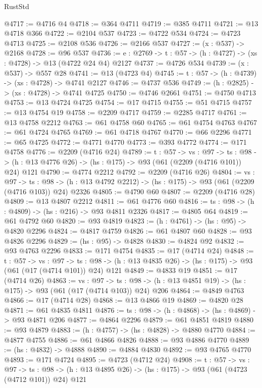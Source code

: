 \begin{lexlean}{RustStd}
\begin{coremodule}
@4717 := @4716 @4
@4718 := @364 @4711
@4719 := @385 @4711
@4721 := @13 @4718 @366
@4722 := @2104 @537
@4723 := @4722 @534
@4724 := @4723 @4713
@4725 := @2108 @536
@4726 := @2166 @537
@4727 := (x : @537) -> @2168
@4728 := @96 @537
@4736 := {e : @2769} -> {t : @57} -> (h : @4727) -> (xs : @4728) -> @13 (@4722 @24 @4) @2127
@4737 := @4726 @534
@4739 := (x : @537) -> @557 @28
@4741 := @13 (@4723 @4)
@4745 := {t : @57} -> (h : @4739) -> (xs : @4728) -> @4741 @2127
@4746 := @4737 @536
@4749 := (h : @2825) -> (xs : @4728) -> @4741 @4725
@4750 := @4746 @2661
@4751 := @4750 @4713
@4753 := @13 @4724 @4725
@4754 := @17 @4715
@4755 := @51 @4715
@4757 := @13 @4754 @19
@4758 := @2209 @4717
@4759 := @2285 @4717
@4761 := @13 @4758 @2212
@4763 := @61 @4758 @60
@4765 := @61 @4754 @4763
@4767 := @61 @4724 @4765
@4769 := @61 @4718 @4767
@4770 := @66 @2296
@4771 := @65 @4725
@4772 := @4771 @4770
@4773 := @393 @4772
@4774 := @171 @4758
@4776 := @2209 (@4716 @24)
@4789 := {t : @57} ->
  {vs : @97} ->
  {ts : @98} -> (h : @13 @4776 @26) -> (hs : @175) -> @93 (@61 (@2209 (@4716 @101)) @24) @121
@4790 := @4774 @2212
@4792 := @2209 (@4716 @26)
@4804 := {vs : @97} ->
  {ts : @98} -> (h : @13 @4792 @2212) -> (hs : @175) -> @93 (@61 (@2209 (@4716 @103)) @24) @2326
@4805 := @4790 @60
@4807 := @2209 (@4716 @28)
@4809 := @13 @4807 @2212
@4811 := @61 @4776 @60
@4816 := {ts : @98} -> (h : @4809) -> (hs : @216) -> @93 @4811 @2326
@4817 := @4805 @64
@4819 := @61 @4792 @60
@4820 := @93 @4819
@4823 := (h : @4761) -> (hs : @95) -> @4820 @2296
@4824 := @4817 @4759
@4826 := @61 @4807 @60
@4828 := @93 @4826 @2296
@4829 := (hs : @95) -> @4828
@4830 := @4824 @92
@4832 := @93 @4763 @2296
@4833 := @171 @4754
@4835 := @17 (@4714 @24)
@4848 := {t : @57} ->
  {vs : @97} ->
  {ts : @98} -> (h : @13 @4835 @26) -> (hs : @175) -> @93 (@61 (@17 (@4714 @101)) @24) @121
@4849 := @4833 @19
@4851 := @17 (@4714 @26)
@4863 := {vs : @97} ->
  {ts : @98} -> (h : @13 @4851 @19) -> (hs : @175) -> @93 (@61 (@17 (@4714 @103)) @24) @206
@4864 := @4849 @4763
@4866 := @17 (@4714 @28)
@4868 := @13 @4866 @19
@4869 := @4820 @28
@4871 := @61 @4835 @4811
@4876 := {ts : @98} -> (h : @4868) -> (hs : @4869) -> @93 @4871 @206
@4877 := @4864 @2296
@4879 := @61 @4851 @4819
@4880 := @93 @4879
@4883 := (h : @4757) -> (hs : @4828) -> @4880 @4770
@4884 := @4877 @4755
@4886 := @61 @4866 @4826
@4888 := @93 @4886 @4770
@4889 := (hs : @4832) -> @4888
@4890 := @4884 @4830
@4892 := @93 @4765 @4770
@4893 := @171 @4724
@4895 := @4723 (@4712 @24)
@4908 := {t : @57} ->
  {vs : @97} ->
  {ts : @98} -> (h : @13 @4895 @26) -> (hs : @175) -> @93 (@61 (@4723 (@4712 @101)) @24) @121

\end{coremodule}
\end{lexlean}
